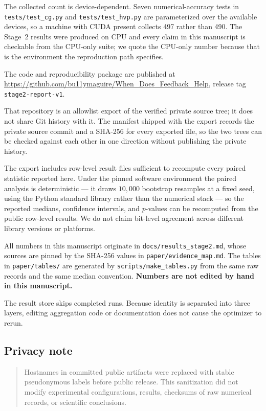 The collected count is device-dependent. Seven numerical-accuracy tests in
\texttt{tests/test\_cg.py} and \texttt{tests/test\_hvp.py} are parameterized over the
available devices, so a machine with CUDA present collects 497 rather than 490. The
Stage~2 results were produced on CPU and every claim in this manuscript is checkable
from the CPU-only suite; we quote the CPU-only number because that is the environment
the reproduction path specifies.

The code and reproducibility package are published at
\url{https://github.com/bu11ymaguire/When_Does_Feedback_Help}, release tag
\texttt{stage2-report-v1}.

That repository is an allowlist export of the verified private source tree; it does not
share Git history with it. The manifest shipped with the export records the private
source commit and a SHA-256 for every exported file, so the two trees can be checked
against each other in one direction without publishing the private history.

The export includes row-level result files sufficient to recompute every paired
statistic reported here. Under the pinned software environment the paired analysis is
deterministic --- it draws $10{,}000$ bootstrap resamples at a fixed seed, using the
Python standard library rather than the numerical stack --- so the reported medians,
confidence intervals, and $p$-values can be recomputed from the public row-level
results. We do not claim bit-level agreement across different library versions or
platforms.

All numbers in this manuscript originate in \texttt{docs/results\_stage2.md}, whose
sources are pinned by the SHA-256 values in \texttt{paper/evidence\_map.md}. The
tables in \texttt{paper/tables/} are generated by
\texttt{scripts/make\_tables.py} from the same raw records and the same median
convention. \textbf{Numbers are not edited by hand in this manuscript.}

The result store skips completed runs. Because identity is separated into three
layers, editing aggregation code or documentation does not cause the optimizer to
rerun.

\subsection*{Privacy note}

\begin{quote}
Hostnames in committed public artifacts were replaced with stable pseudonymous labels
before public release. This sanitization did not modify experimental configurations,
results, checksums of raw numerical records, or scientific conclusions.
\end{quote}

